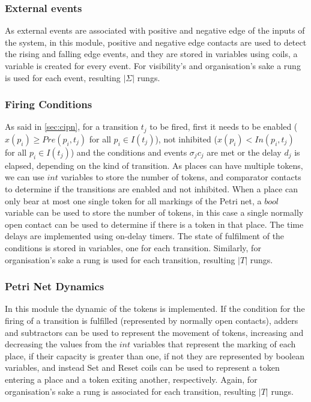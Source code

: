 \subsubsection{External events}
As external events are associated with positive and negative edge of the inputs
of the system, in this module, positive and negative edge contacts are used to
detect the rising and falling edge events, and they are stored in variables
using coils, a variable is created for every event.
For visibility's and organisation's sake a rung is used for each event,
resulting $|\Sigma|$ rungs. 
\subsubsection{Firing Conditions}
As said in \ref{sec:cipn}, for a transition $t_j$ to be fired, first it needs to be
enabled ($x(p_i)\geq Pre(p_i,t_j)$ for all $p_i\in I(t_j)$), not inhibited
($x(p_i)< In(p_i,t_j)$ for all $p_i\in I(t_j)$) and the conditions and events
$\sigma_jc_j$ are met or the delay $d_j$ is elapsed, depending on the kind of
transition.
As places can have multiple tokens, we can use $int$ variables to store the
number of tokens, and comparator contacts to determine if the transitions are
enabled and not inhibited.
When a place can only bear at most one single token for all markings of the
Petri net, a $bool$ variable can be used to store the number of tokens, in this
case a single normally open contact can be used to determine if there is a token
in that place.
The time delays are implemented using on-delay
timers. The state of fulfilment of the conditions is stored in variables, one
for each transition.
Similarly, for organisation's sake a rung is used for each transition, resulting
$|T|$ rungs.
\subsubsection{Petri Net Dynamics}
In this module the dynamic of the tokens is implemented. If the condition for
the firing of a transition is fulfilled (represented by normally open contacts), adders and subtractors
can be used to represent the movement of tokens, increasing and decreasing the
values from the $int$ variables that represent the marking
of each place, if their capacity is greater than one, if not they are
represented by boolean variables, and instead Set and Reset coils can be used to
represent a token entering a place and a token exiting another, respectively.
Again, for organisation's sake a rung is associated for each transition,
resulting $|T|$ rungs.

